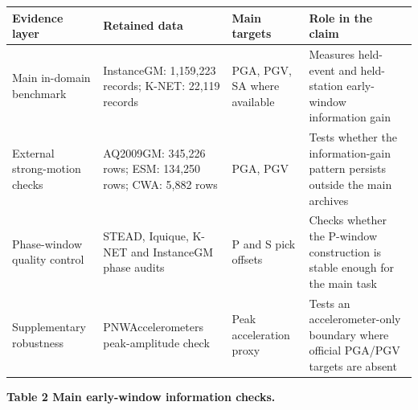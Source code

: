 \documentclass[
  10pt,
]{article}
\newcounter{none} %
\begin{document}
{\def\LTcaptype{none} %
\begin{longtable}[]{@{}
  >{\raggedright\arraybackslash}p{}
  >{\raggedright\arraybackslash}p{}
  >{\raggedright\arraybackslash}p{}
  >{\raggedright\arraybackslash}p{}@{}}
\toprule\noalign{}
\begin{minipage}[b]{\linewidth}\raggedright
Evidence layer
\end{minipage} & \begin{minipage}[b]{\linewidth}\raggedright
Retained data
\end{minipage} & \begin{minipage}[b]{\linewidth}\raggedright
Main targets
\end{minipage} & \begin{minipage}[b]{\linewidth}\raggedright
Role in the claim
\end{minipage} \\
\midrule\noalign{}
\endhead
\bottomrule\noalign{}
\endlastfoot
Main in-domain benchmark & InstanceGM: 1,159,223 records; K-NET: 22,119
records & PGA, PGV, SA where available & Measures held-event and
held-station early-window information gain \\
External strong-motion checks & AQ2009GM: 345,226 rows; ESM: 134,250
rows; CWA: 5,882 rows & PGA, PGV & Tests whether the information-gain
pattern persists outside the main archives \\
Phase-window quality control & STEAD, Iquique, K-NET and InstanceGM
phase audits & P and S pick offsets & Checks whether the P-window
construction is stable enough for the main task \\
Supplementary robustness & PNWAccelerometers peak-amplitude check & Peak
acceleration proxy & Tests an accelerometer-only boundary where official
PGA/PGV targets are absent \\
\end{longtable}
}

\clearpage

\textbf{Table 2 \textbar{} Main early-window information checks.}
\end{document}
